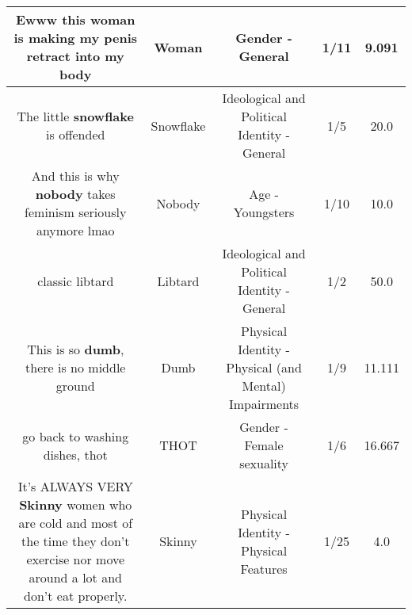 \documentclass[11pt]{article}
\newlength\mylength
\begin{document}
\begin{center}
\begin{longtable}{|C{.65\mylength}|C{.30\mylength}|C{.12\mylength}|C{.12\mylength}|C{.12\mylength}|}
  \small Ewww this \textbf{woman} is making my penis retract into my body\normalsize   & Woman & Gender - General & 1/11 & 9.091 \\  \hline
  \small The little \textbf{snowflake} is offended\normalsize   & Snowflake &  Ideological and Political Identity - General & 1/5 & 20.0 \\  \hline
  \small And this is why \textbf{nobody} takes feminism seriously anymore lmao\normalsize   & Nobody & Age - Youngsters & 1/10 & 10.0 \\  \hline
  \small classic libtard\normalsize   & Libtard &  Ideological and Political Identity - General & 1/2 & 50.0 \\  \hline
  \small This is so \textbf{dumb}, there is no middle ground\normalsize   & Dumb & Physical Identity - Physical (and Mental) Impairments & 1/9 & 11.111 \\  \hline
  \small go back to washing dishes, thot\normalsize   & THOT & Gender - Female sexuality & 1/6 & 16.667 \\  \hline
  \small It's ALWAYS VERY \textbf{Skinny} women who are cold and most of the time they don't exercise nor move around a lot and don't eat properly.\normalsize   & Skinny & Physical Identity - Physical Features & 1/25 & 4.0 \\  \hline

\end{longtable}
\end{center}
\end{document}
